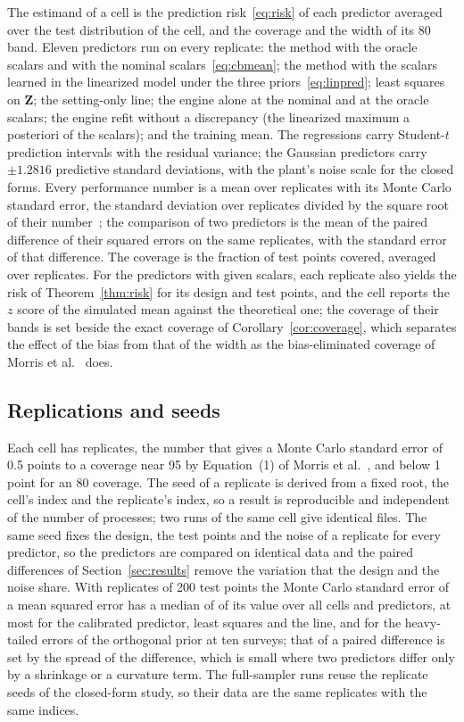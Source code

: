 The estimand of a cell is the prediction risk~\eqref{eq:risk} of each predictor averaged over the test distribution of the
cell, and the coverage and the width of its 80\pct{} band. Eleven predictors run on every replicate: the method with the
oracle scalars and with the nominal scalars~\eqref{eq:cbmean}; the method with the scalars learned in the linearized model
under the three priors~\eqref{eq:linpred}; least squares on $\mathbf Z$; the setting-only line; the engine alone at the nominal
and at the oracle scalars; the engine refit without a discrepancy (the linearized maximum a posteriori of the scalars); and the
training mean. The regressions carry Student-$t$ prediction intervals with the residual variance; the Gaussian predictors carry
$\pm1.2816$ predictive standard deviations, with the plant's noise scale for the closed forms. Every performance number is a
mean over replicates with its Monte Carlo standard error, the standard deviation over replicates divided by the square root of
their number~\cite{morris}; the comparison of two predictors is the mean of the paired difference of their squared errors on
the same replicates, with the standard error of that difference. The coverage is the fraction of test points covered,
averaged over replicates. For the predictors with given scalars, each replicate also yields the risk of
Theorem~\ref{thm:risk} for its design and test points, and the cell reports the $z$ score of the simulated mean against the
theoretical one; the coverage of their bands is set beside the exact coverage of Corollary~\ref{cor:coverage}, which separates
the effect of the bias from that of the width as the bias-eliminated coverage of Morris et al.~\cite{morris} does.

\subsection{Replications and seeds}

Each cell has \repsPerCell{} replicates, the number that gives a Monte Carlo standard error of 0.5 points to a coverage near 95\pct{}
by Equation~(1) of Morris et al.~\cite{morris}, and below 1 point for an 80\pct{} coverage. The seed of a replicate is derived
from a fixed root, the cell's index and the replicate's index, so a result is reproducible and independent of the number of
processes; two runs of the same cell give identical files. The same seed fixes the design, the test points and the noise of a
replicate for every predictor, so the predictors are compared on identical data and the paired differences of
Section~\ref{sec:results} remove the variation that the design and the noise share. With \repsPerCell{} replicates of 200 test points the
Monte Carlo standard error of a mean squared error has a median of \mcseMedian\pct{} of its value over all cells and predictors,
at most \mcseMainMax\pct{} for the calibrated predictor, least squares and the line, and \mcseMax\pct{} for the heavy-tailed errors
of the orthogonal prior at ten surveys; that of a paired difference
is set by the spread of the difference, which is small where two predictors differ only by a shrinkage or a curvature term. The
full-sampler runs reuse the replicate seeds of the closed-form study, so their data are the same replicates with the same
indices.

